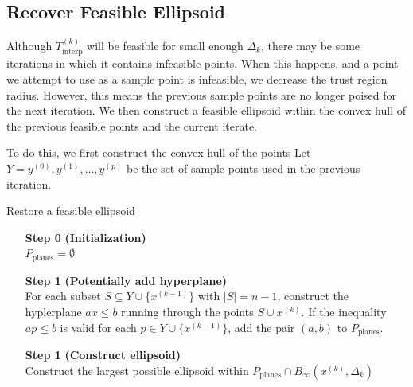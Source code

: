 \documentclass{article}
\newenvironment{comment}
  {\par\medskip
   \color{red}%
   \begin{framed}
   \textbf{Comment: }\ignorespaces}
 {\end{framed}
  \medskip}
\theoremstyle{case}
\newcommand{\xk}{{x^{(k)}}}
\newcommand{\dk}{\Delta_k}
\newcommand{\sampletrk}{{T_{\text{interp}}^{(k)}}}
\newcommand{\tr}{{ B_{\infty}\left(\xk, \dk\right) }}
\begin{document}
\subsection{Recover Feasible Ellipsoid}

Although $\sampletrk$ will be feasible for small enough $\dk$, there may be some iterations in which it contains infeasible points.
When this happens, and a point we attempt to use as a sample point is infeasible, we decrease the trust region radius.
However, this means the previous sample points are no longer poised for the next iteration.
We then construct a feasible ellipsoid within the convex hull of the previous feasible points and the current iterate.

%             
% 


To do this, we first construct the convex hull of the points 
Let $Y = y^{(0)}, y^{(1)}, \ldots, y^{(p)}$ be the set of sample points used in the previous iteration.

\begin{algorithm}[H]
    \caption{Restore a feasible ellipsoid}
    \label{compute_convex_hull}
    \begin{itemize}
        \item[\textbf{Step 0}] \textbf{(Initialization)} \\
            $P_{\textrm{planes}} = \emptyset$
            
        \item[\textbf{Step 1}] \textbf{(Potentially add hyperplane)} \\
	    For each subset $S \subseteq Y \cup \{x^{(k-1)}\}$ with $|S| = n - 1$, construct the hyplerplane $ax\le b$ running through the points $S \cup \xk$.
	    If the inequality $ap \le b$ is valid for each $p \in Y \cup \{x^{(k-1)}\}$, add the pair $(a, b)$ to $P_{\textrm{planes}}$.
	
	\item[\textbf{Step 1}] \textbf{(Construct ellipsoid)} \\
	   Construct the largest possible ellipsoid within $P_{\textrm{planes}} \cap \tr$
    \end{itemize}
\end{algorithm}
\end{document}
